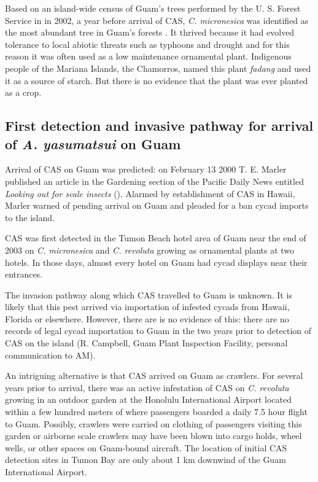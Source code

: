 \documentclass[12pt,letterpaper,english,bibliography=totocnumbered, abstract=on]{scrartcl}
\begin{document}
Based on an island-wide census of Guam's trees performed by the U. S. Forest Service in in 2002, a year before arrival of CAS, \textit{C. micronesica} was identified as the most abundant tree in Guam's forests \cite{donnegon_guams_2004}. It thrived because it had evolved tolerance to local abiotic threats such as typhoons and drought and for this reason it was often used as a low maintenance ornamental plant. Indigenous people of the Mariana Islands, the Chamorros, named this plant \textit{fadang} and used it as a source of starch. But there is no evidence that the plant was ever planted as a crop.   

\subsection{First detection and invasive pathway for arrival of \textit{A. yasumatsui} on Guam} 

Arrival of CAS on Guam was predicted: on February 13 2000 T. E. Marler published an article in the Gardening section of the Pacific Daily News entitled \textit{Looking out for scale insects} (\cite{haynesExoticInvasivePest2005}). Alarmed by establishment of CAS in Hawaii, Marler warned of pending arrival on Guam and pleaded for a ban cycad imports to the island. 

CAS was first detected in the Tumon Beach hotel area of Guam near the end of 2003 on \textit{C. micronesica} and \textit{C. revoluta} growing as ornamental plants at two hotels. In those days, almost every hotel on Guam had cycad displays near their entrances.

The invasion pathway along which CAS travelled to Guam is unknown.
It is likely that this pest arrived via importation of infested cycads from Hawaii, Florida or elsewhere. However, there are is no evidence of this: there are no records of legal cycad importation to Guam in the two years prior to detection of CAS on the island (R. Campbell, Guam Plant Inspection Facility, personal communication to AM).  

An intriguing alternative is that CAS arrived on Guam as crawlers. For several years prior to arrival, there was an active infestation of CAS on \textit{C. revoluta} growing in an outdoor garden at the Honolulu International Airport located within a few hundred meters of where passengers boarded a daily 7.5 hour flight to Guam. Possibly, crawlers were carried on clothing of passengers visiting this garden or airborne scale crawlers may have been blown into cargo holds, wheel wells, or other spaces on Guam-bound aircraft. The location of initial CAS detection sites in Tumon Bay are only about 1 km downwind of the Guam International Airport.
\end{document}
